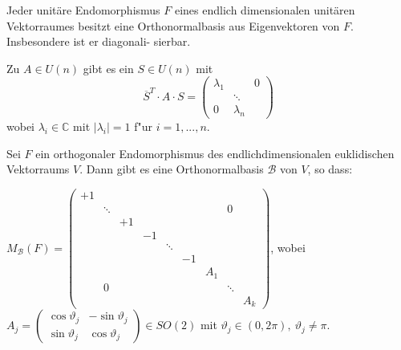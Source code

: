\documentclass[11pt, a4paper]{article}
\begin{document}
\begin{theorem}
Jeder unitäre Endomorphismus \(F\) eines endlich dimensionalen unitären Vektorraumes besitzt
eine Orthonormalbasis aus Eigenvektoren von \(F .\) Insbesondere ist er diagonali-
sierbar.
\end{theorem}

\begin{corollary}
Zu \(A \in U(n)\) gibt es ein \(S \in U(n)\) mit
$$
 \overline{S}^T \cdot A \cdot S = \left(\begin{array}{ccc}\lambda_{1} & & 0 \\ & \ddots & \\ 0 & \lambda_{n}\end{array}\right)
 $$
wobei $\lambda_{i} \in \mathbb{C}$ mit $|\lambda_{i}|=1$ f"ur $i=1, ..., n $.
\end{corollary}


\begin{theorem}
Sei $F$ ein orthogonaler Endomorphismus des endlichdimensionalen euklidischen Vektorraums $V$. Dann gibt es eine Orthonormalbasis $\mathcal{B}$ von $V$, so dass:

$M_\mathcal{B}(F) =
\left( \begin{array}{ccccccccc}
{+1} & {} & {} & {} & {} & {} & {} & {} & {} 
\\ {} & {\ddots} & {} & {} & {} & {} & {} & {0} & {} 
\\ {} & {} & {+1} & {} & {} & {} & {} & {} & {} 
\\ {} & {} & {} & {-1} & {} & {} & {} & {} & {} 
\\ {} & {} & {} & {} & {}\ddots & {} & {} & {} & {} 
\\ {} & {} & {} & {} & {} & {-1} & {} & {} & {} 
\\ {} & {} & {} & {} & {} & {} & {A_1} & {} & {} 
\\ {} & {0} & {} & {} & {} & {} & {} & {\ddots} & {} 
\\ {} & {} & {} & {} & {} & {} & {} & {} & {A_k} 
\end{array} 
\right)$,
wobei $A_{j}=\left(\begin{array}{cc}\cos \vartheta_{j} & -\sin \vartheta_{j} \\ \sin \vartheta_{j} & \cos \vartheta_{j}\end{array}\right) \in SO(2)$ mit $\vartheta_j \in (0, 2\pi), \ \vartheta_j \neq \pi$.

\end{theorem}

\end{document}
